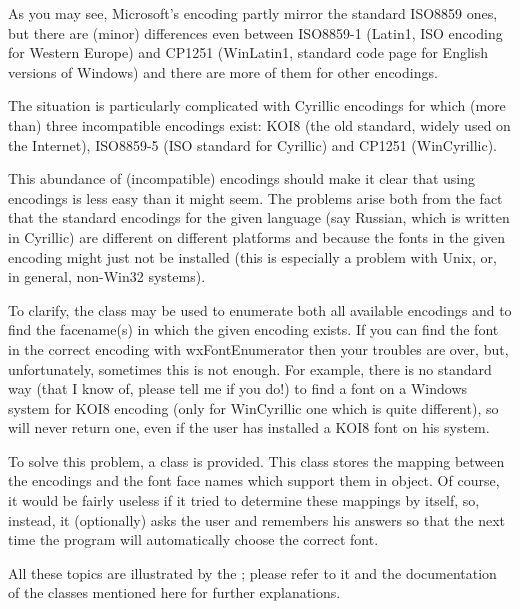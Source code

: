 As you may see, Microsoft's encoding partly mirror the standard ISO8859 ones,
but there are (minor) differences even between ISO8859-1 (Latin1, ISO encoding
for Western Europe) and CP1251 (WinLatin1, standard code page for English
versions of Windows) and there are more of them for other encodings.

The situation is particularly complicated with Cyrillic encodings for which
(more than) three incompatible encodings exist: KOI8 (the old standard, widely
used on the Internet), ISO8859-5 (ISO standard for Cyrillic) and CP1251
(WinCyrillic).

This abundance of (incompatible) encodings should make it clear that using
encodings is less easy than it might seem. The problems arise both from the
fact that the standard encodings for the given language (say Russian, which is
written in Cyrillic) are different on different platforms and because the
fonts in the given encoding might just not be installed (this is especially a
problem with Unix, or, in general, non-Win32 systems).

To clarify, the  
class may be used to enumerate both all available encodings and to find the
facename(s) in which the given encoding exists. If you can find the font in
the correct encoding with wxFontEnumerator then your troubles are over, but,
unfortunately, sometimes this is not enough. For example, there is no standard
way (that I know of, please tell me if you do!) to find a font on a Windows system
for KOI8 encoding (only for WinCyrillic one which is quite different), so 
 will never return one, even if
the user has installed a KOI8 font on his system.

To solve this problem, a  class is provided.
This class stores the mapping between the encodings and the font face
names which support them in  object. Of
course, it would be fairly useless if it tried to determine these mappings by
itself, so, instead, it (optionally) asks the user and remembers his answers
so that the next time the program will automatically choose the correct font.

All these topics are illustrated by the ;
please refer to it and the documentation of the classes mentioned here for
further explanations.

